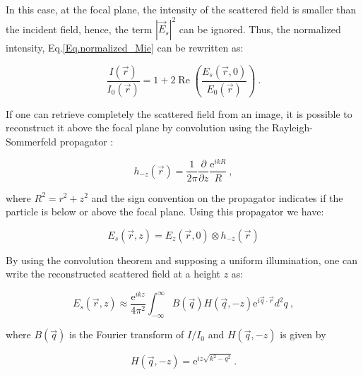 In this case, at the focal plane, the intensity of the scattered field is smaller than the incident field, hence, the term $|\vec{E}_s|^2$ can be ignored. Thus, the normalized intensity, Eq.\ref{Eq.normalized_Mie} can be rewritten as:

\begin{equation}
\frac{I(\vec{r})}{I_0(\vec{r})}= 1 + 2\operatorname{Re}\left( \frac{E_s(\vec{r},0)}{E_0(\vec{r})} \right) ~.
\end{equation}

If one can retrieve completely the scattered field from an image, it is possible to reconstruct it above the focal plane by convolution using the Rayleigh-Sommerfeld propagator \cite{goodman_introduction_2005}:

\begin{equation}
	h_{-z}(\vec{r}) = \frac{1}{2 \pi} \frac{\partial}{\partial z} \frac{\mathrm{e}^{ikR}}{R} ~,
	\label{Eq:propagator}
\end{equation}

where $ R^2 = r^2 + z^2 $ and the sign convention on the propagator indicates if the particle is below or above the focal plane. Using this propagator we have:

\begin{equation}
	E_s(\vec{r}, z) = E_z(\vec{r}, 0) \otimes h_{-z}(\vec{r})
\end{equation}

By using the convolution theorem \cite{cheong_strategies_2010, goodman_introduction_2005, sherman_application_1967,schnars_digital_1994} and supposing a uniform illumination, one can write the reconstructed scattered field at a height $z$ as:

\begin{equation}
	E_s(\vec{r}, z) \approx \frac{\mathrm{e}^{ikz}}{4\pi ^2}
	\int ^\infty _{- \infty}
	B(\vec{q}) H(\vec{q}, -z) \mathrm{e}^{i \vec{q} \cdot \vec{r}} d^2 q
	\label{Eq.RS} ~,
\end{equation}

where $B(\vec{q})$ is the Fourier transform of $I/I_0$ and $H(\vec{q}, -z)$ is given by

\begin{equation}
	H(\vec{q}, -z) = \mathrm{e}^{iz \sqrt{k^2 - q^2}} ~.
\end{equation}

